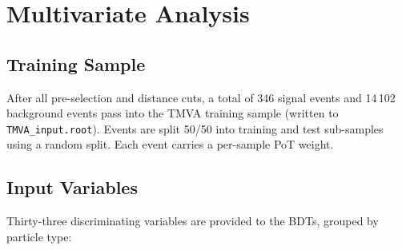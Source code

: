 \documentclass[12pt,a4paper]{article}
\begin{document}
\section{Multivariate Analysis}
\label{sec:mva}

\subsection{Training Sample}

After all pre-selection and distance cuts, a total of 346 signal events
and 14\,102 background events pass into the TMVA training sample
(written to \texttt{TMVA\_input.root}).  Events are split 50/50 into
training and test sub-samples using a random split.  Each event carries
a per-sample PoT weight.

\subsection{Input Variables}

Thirty-three discriminating variables are provided to the BDTs,
grouped by particle type:
\end{document}

